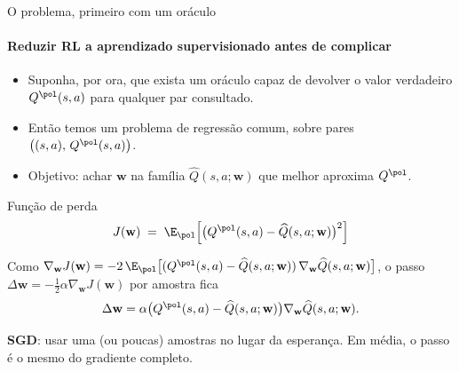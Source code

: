 \documentclass[aspectratio=169, 11pt]{beamer}
\newcommand{\Qhat}{\widehat{Q}}
\newcommand{\wv}{\mathbf{w}}
\begin{document}
\begin{frame}{O problema, primeiro com um oráculo}
  \framesubtitle{Reduzir RL a aprendizado supervisionado antes de complicar}

  \begin{itemize}\setlength{\itemsep}{0.35ex}
    \item Suponha, por ora, que exista um oráculo capaz de devolver o valor
      verdadeiro $Q^{\pol}(s,a)$ para qualquer par consultado.
    \item Então temos um problema de regressão comum, sobre pares
      $\bigl((s,a),\, Q^{\pol}(s,a)\bigr)$.
    \item Objetivo: achar $\wv$ na família $\Qhat(s,a;\wv)$ que melhor
      aproxima $Q^{\pol}$.
  \end{itemize}

  \vspace{-0.7em}
  \begin{defbox}{Função de perda}
    \[ J(\wv) \;=\; \E_{\pol}\Bigl[\bigl(Q^{\pol}(s,a) - \Qhat(s,a;\wv)\bigr)^2\Bigr] \]
  \end{defbox}

  \vspace{-0.7em}
  {\small Como
  $\nabla_{\wv} J(\wv) = -2\,\E_{\pol}\bigl[(Q^{\pol}(s,a) - \Qhat(s,a;\wv))\,\nabla_{\wv}\Qhat(s,a;\wv)\bigr]$,
  o passo $\Delta \wv = -\tfrac{1}{2}\alpha \nabla_{\wv} J(\wv)$ por amostra fica}
  \vspace{-0.6em}
  \[ \Delta \wv = \alpha\bigl(Q^{\pol}(s,a) - \Qhat(s,a;\wv)\bigr)\nabla_{\wv}\Qhat(s,a;\wv). \]
  \vspace{-1.3em}

  {\small \textbf{SGD}: usar uma (ou poucas) amostras no lugar da
  esperança. Em média, o passo é o mesmo do gradiente completo.}
\end{frame}
\end{document}
